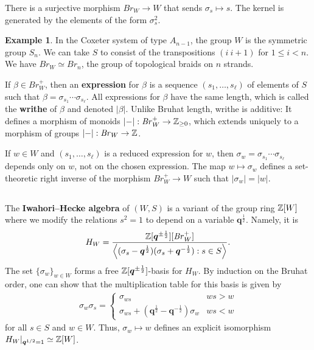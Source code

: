 \documentclass[a4paper,10pt,leqno]{amsart}
\theoremstyle{plain}
\theoremstyle{plain}
\theoremstyle{plain}
\theoremstyle{definition}
\newtheorem{ex}[thm]{Example}
\theoremstyle{remark}
\newcommand{\dfemph}[1]{\textbf{#1}}
\newcommand{\Br}{\mathit{Br}}
\newcommand{\Q}{\bm{q}}
\begin{document}
There is a surjective morphism $\Br_W \to W$ that sends $\sigma_s \mapsto s$.
The kernel is generated by the elements of the form $\sigma_s^2$.

\begin{ex}
In the Coxeter system of type $A_{n - 1}$, the group $W$ is the symmetric group $S_n$.
We can take $S$ to consist of the transpositions $(i~i + 1)$ for $1 \leq i < n$.
We have $\Br_W \simeq \Br_n$, the group of topological braids on $n$ strands.
\end{ex}

If $\beta \in \Br_W^+$, then an \dfemph{expression} for $\beta$ is a sequence $(s_1, \ldots, s_\ell)$ of elements of $S$ such that $\beta = \sigma_{s_1} \cdots \sigma_{s_\ell}$.
All expressions for $\beta$ have the same length, which is called the \dfemph{writhe} of $\beta$ and denoted $|\beta|$.
Unlike Bruhat length, writhe is additive:
It defines a morphism of monoids $|{-}| : \Br_W^+ \to \bb{Z}_{\geq 0}$, which extends uniquely to a morphism of groups $|{-}| : \Br_W \to \bb{Z}$.

If $w \in W$ and $(s_1, \ldots, s_\ell)$ is a reduced expression for $w$, then $\sigma_w = \sigma_{s_1} \cdots \sigma_{s_\ell}$ depends only on $w$, not on the chosen expression.
The map $w \mapsto \sigma_w$ defines a set-theoretic right inverse of the morphism $\Br_W^+ \to W$ such that $|\sigma_w| = |w|$.

\subsection{}\label{subsec:hecke}

The \dfemph{Iwahori--Hecke algebra} of $(W, S)$ is a variant of the group ring $\mathbb{Z}[W]$ where we modify the relations $s^2 = 1$ to depend on a variable $\Q^{\frac{1}{2}}$.
Namely, it is
\begin{align}
H_W = \frac{\bb{Z}[\Q^{\pm\frac{1}{2}}][\Br_W^+]}{\left\langle (\sigma_s - \Q^{\frac{1}{2}})(\sigma_s + \Q^{-\frac{1}{2}}) : s \in S\right\rangle}.
\end{align}
The set $\{\sigma_w\}_{w \in W}$ forms a free $\bb{Z}[\Q^{\pm\frac{1}{2}}]$-basis for $H_W$.
By induction on the Bruhat order, one can show that the multiplication table for this basis is given by
\begin{align}\label{eq:hecke-multiplication}
\sigma_w \sigma_s =
\left\{\begin{array}{ll}
\sigma_{ws}
	&ws > w\\
\sigma_{ws} + (\Q^{\frac{1}{2}} - \Q^{-\frac{1}{2}})\sigma_w 
	&ws < w
\end{array}\right.
\end{align}
for all $s \in S$ and $w \in W$.
Thus, $\sigma_w \mapsto w$ defines an explicit isomorphism $H_W|_{\Q^{1/2} = 1} \simeq \bb{Z}[W]$.
\end{document}
